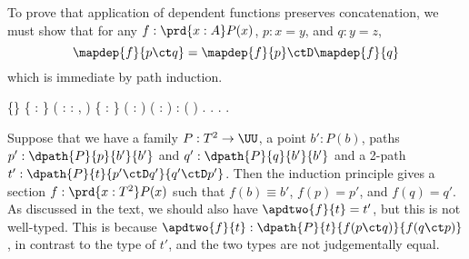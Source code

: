 \noindent
To prove that application of dependent functions preserves concatenation,
we must show that for any $f : \prd{x:A}P(x)$, $p : x = y$, and $q : y = z$,
\[
  \mapdep{f}{p \ct q} = \mapdep{f}{p} \ctD \mapdep{f}{q}
\]
which is immediate by path induction.
\begin{coqdoccode}
\coqdocemptyline
\coqdocnoindent
{}  \{\} \{ :   \} ( : \coqdockw{\ensuremath{\forall}}  : ,  ) \coqdoceol
\coqdocindent{4.00em}
\{   : \} ( :  \coqdocnotation{=} ) ( :  \coqdocnotation{=} ) :\coqdoceol
\coqdocindent{1.00em}
  (  ) \coqdocnotation{=}       .\coqdoceol
\coqdocnoindent
{}.\coqdoceol
\coqdocindent{1.00em}
 .\coqdoceol
\coqdocnoindent
{}.\coqdoceol
\coqdocemptyline
\end{coqdoccode}
\noindent
Suppose that we have a family $P : T^{2} \to \UU$, a point $b' : P(b)$, paths
$p' : \dpath{P}{p}{b'}{b'}$ and $q' : \dpath{P}{q}{b'}{b'}$ and a 2-path $t' :
\dpath{P}{t}{p' \ctD q'}{q' \ctD p'}$.  Then the induction principle gives a
section $f : \prd{x : T^{2}} P(x)$ such that $f(b) \equiv b'$, $f(p) = p'$, and
$f(q) = q'$.  As discussed in the text, we should also have $\apdtwo{f}{t} =
t'$, but this is not well-typed.  This is because $\apdtwo{f}{t} :
\dpath{P}{t}{f(p \ct q)}{f(q \ct p)}$, in contrast to the type of $t'$, and the
two types are not judgementally equal.


